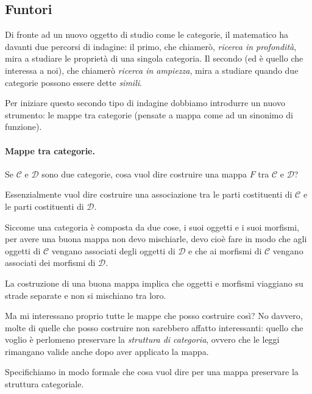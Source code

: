 \documentclass[12pt]{article}
\begin{document}
\subsection{Funtori}

Di fronte ad un nuovo oggetto di studio come le categorie, il matematico ha davanti due percorsi di indagine: il primo, che chiamerò, \emph{ricerca in profondità},
mira a studiare le proprietà di una singola categoria. Il secondo (ed è quello che interessa a noi), che chiamerò \emph{ricerca in ampiezza},
mira a studiare quando due categorie possono essere dette \emph{simili}.

Per iniziare questo secondo tipo di indagine dobbiamo introdurre un nuovo strumento: le mappe tra categorie
(pensate a mappa come ad un sinonimo di funzione).

\paragraph{Mappe tra categorie.} Se $\mathcal{C}$ e $\mathcal{D}$ sono due categorie, cosa vuol dire costruire una mappa $F$ tra $\mathcal{C}$ e $\mathcal{D}$?

Essenzialmente vuol dire costruire una associazione tra le parti costituenti di $\mathcal{C}$ e le parti costituenti di $\mathcal{D}$.

Siccome una categoria è composta da due cose, i suoi oggetti e i suoi morfismi, per avere una buona mappa non devo mischiarle,
devo cioè fare in modo che agli oggetti di $\mathcal{C}$ vengano associati degli oggetti di $\mathcal{D}$ e che ai morfismi di
$\mathcal{C}$ vengano associati dei morfismi di $\mathcal{D}$.

La costruzione di una buona mappa implica che oggetti e morfismi viaggiano su strade separate e non si mischiano tra loro.

Ma mi interessano proprio tutte le mappe che posso costruire così? No davvero, molte di quelle che posso costruire
non sarebbero affatto interessanti: quello che voglio è perlomeno preservare la \emph{struttura di categoria},
ovvero che le leggi rimangano valide anche dopo aver applicato la mappa.

Specifichiamo in modo formale che cosa vuol dire per una mappa preservare la struttura categoriale.
\end{document}
